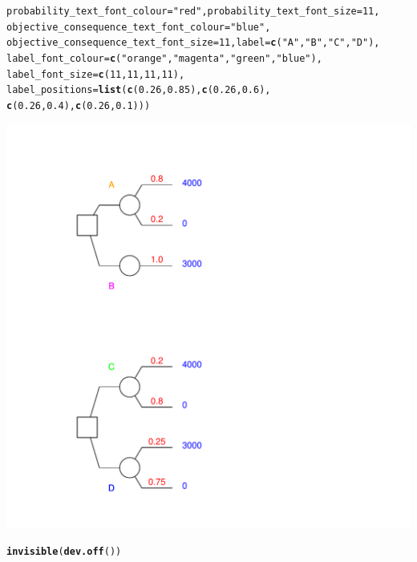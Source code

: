 \documentclass{article}\usepackage[]{graphicx}\usepackage[]{color}
\makeatletter
\newcommand{\hlnum}[1]{\textcolor[rgb]{0.686,0.059,0.569}{#1}}%
\newcommand{\hlstr}[1]{\textcolor[rgb]{0.192,0.494,0.8}{#1}}%
\newcommand{\hlstd}[1]{\textcolor[rgb]{0.345,0.345,0.345}{#1}}%
\newcommand{\hlkwc}[1]{\textcolor[rgb]{0.333,0.667,0.333}{#1}}%
\newcommand{\hlkwd}[1]{\textcolor[rgb]{0.737,0.353,0.396}{\textbf{#1}}}%
\newenvironment{kframe}{%
 \def\at@end@of@kframe{}%
 \ifinner\ifhmode%
  \def\at@end@of@kframe{\end{minipage}}%
  \begin{minipage}{\columnwidth}%
 \fi\fi%
 \def\FrameCommand##1{\hskip\@totalleftmargin \hskip-\fboxsep
 \colorbox{shadecolor}{##1}\hskip-\fboxsep
     \hskip-\linewidth \hskip-\@totalleftmargin \hskip\columnwidth}%
 \MakeFramed {\advance\hsize-\width
   \@totalleftmargin\z@ \linewidth\hsize
   \@setminipage}}%
 {\par\unskip\endMakeFramed%
 \at@end@of@kframe}
\newenvironment{knitrout}{}{} %
\makeatother
\begin{document}
\begin{knitrout}
\begin{kframe}
\begin{alltt}
        \hlkwc{probability_text_font_colour}\hlstd{=}\hlstr{"red"}\hlstd{,} \hlkwc{probability_text_font_size}\hlstd{=}\hlnum{11}\hlstd{,}
        \hlkwc{objective_consequence_text_font_colour}\hlstd{=}\hlstr{"blue"}\hlstd{,}
        \hlkwc{objective_consequence_text_font_size}\hlstd{=}\hlnum{11}\hlstd{,} \hlkwc{label}\hlstd{=}\hlkwd{c}\hlstd{(}\hlstr{"A"}\hlstd{,}\hlstr{"B"}\hlstd{,}\hlstr{"C"}\hlstd{,} \hlstr{"D"}\hlstd{),}
        \hlkwc{label_font_colour}\hlstd{=}\hlkwd{c}\hlstd{(}\hlstr{"orange"}\hlstd{,}\hlstr{"magenta"}\hlstd{,}\hlstr{"green"}\hlstd{,}\hlstr{"blue"}\hlstd{),}
        \hlkwc{label_font_size}\hlstd{=}\hlkwd{c}\hlstd{(}\hlnum{11}\hlstd{,}\hlnum{11}\hlstd{,}\hlnum{11}\hlstd{,}\hlnum{11}\hlstd{),}
        \hlkwc{label_positions}\hlstd{=}\hlkwd{list}\hlstd{(}\hlkwd{c}\hlstd{(}\hlnum{0.26}\hlstd{,}\hlnum{0.85}\hlstd{),}\hlkwd{c}\hlstd{(}\hlnum{0.26}\hlstd{,}\hlnum{0.6}\hlstd{),}
                \hlkwd{c}\hlstd{(}\hlnum{0.26}\hlstd{,}\hlnum{0.4}\hlstd{),}\hlkwd{c}\hlstd{(}\hlnum{0.26}\hlstd{,}\hlnum{0.1}\hlstd{)))}
\end{alltt}
\end{kframe}

{\centering \includegraphics[width=0.8\linewidth]{figure/unnamed-chunk-12} 

}


\begin{kframe}\begin{alltt}
\hlkwd{invisible}\hlstd{(}\hlkwd{dev.off}\hlstd{())}
\end{alltt}
\end{kframe}
\end{knitrout}
\end{document}
